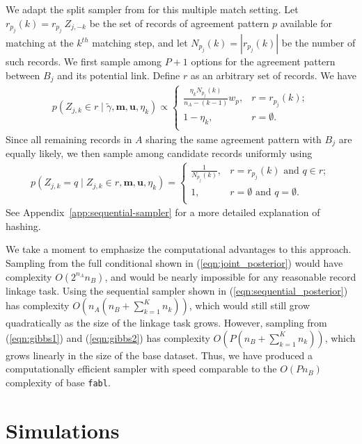 \documentclass[12pt,letterpaper]{article}
\newcommand{\1}[1]{\mathbb{I}\!\left[#1\right]} %
\begin{document}
We adapt the split sampler from \cite{kundinger_2023} for this multiple match setting. Let $r_{p_j}(k) = r_{p_j} \ Z_{j, -k}$ be the set of records of agreement pattern $p$ available for matching at the $k^{th}$ matching step, and let $N_{p_j}(k) = |r_{p_j}(k)|$ be the number of such records. We first sample among $P + 1$ options for the agreement pattern between $B_j$ and its potential link. Define $r$ as an arbitrary set of records. We have
\begin{align}
	\label{eqn:gibbs1}
	p\left( Z_{j, k} \in r \mid \tilde{\gamma}, \bm{m}, \bm{u}, \eta_k \right) \propto
	\begin{cases} 
		\frac{\eta_k N_{p_j}(k)}{n_A - (k - 1)}  w_{p},  & r = r_{p_j}(k); \\
		1- \eta_k , &  r = \emptyset. \\
	\end{cases}
\end{align}
Since all remaining records in $A$ sharing the same agreement pattern with $B_j$ are equally likely, we then sample among candidate records uniformly using
\begin{align}
	\label{eqn:gibbs2}
	p\left(Z_{j, k} = q \mid Z_{j, k} \in r, \bm{m}, \bm{u}, \eta_k \right) = \begin{cases} 
		\frac{1}{N_{p_j}(k)}, & r = r_{p_j}(k) \text{ and } q \in r; \\
		1, & r = \emptyset \text{ and } q = \emptyset. \\
	\end{cases}
\end{align}
See Appendix~\ref{app:sequential-sampler} for a more detailed explanation of hashing. 

We take a moment to emphasize the computational advantages to this approach. Sampling from the full conditional shown in (\ref{eqn:joint_posterior}) would have complexity $O(2^{n_A}n_B)$, and would be nearly impossible for any reasonable record linkage task. Using the sequential sampler shown in (\ref{eqn:sequential_posterior}) has complexity $O\left(n_A (n_B + \sum_{k=1}^K n_k)\right)$, which would still still grow quadratically as the size of the linkage task grows. However, sampling from (\ref{eqn:gibbs1}) and (\ref{eqn:gibbs2}) has complexity $O\left(P (n_B + \sum_{k=1}^K n_k)\right)$, which grows linearly in the size of the base dataset. Thus, we have produced a computationally efficient sampler with speed comparable to the $O(P n_B)$ complexity of base \texttt{fabl}.

\section{Simulations}\label{sec:simulations}
\end{document}
